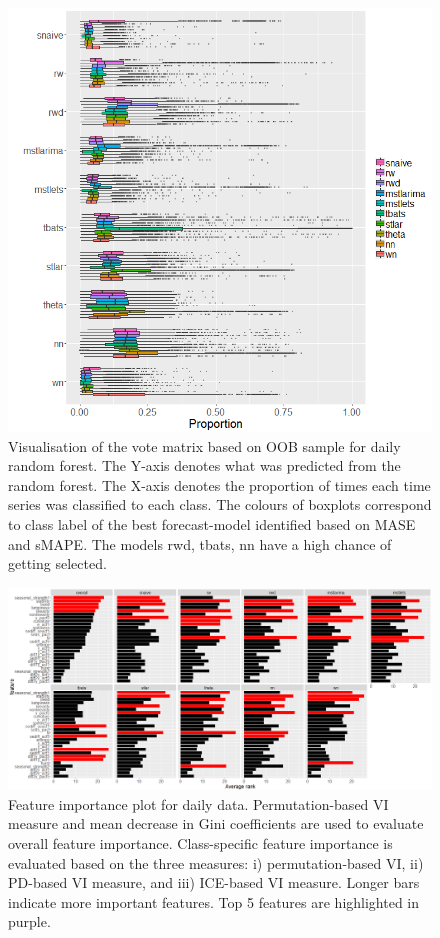 \documentclass[11pt,a4paper,]{article}
\begin{document}
\begin{figure}
\centering
\includegraphics{figures/oobdaily-1.png}
\caption{\label{fig:oobdaily}Visualisation of the vote matrix based on OOB sample for daily random forest. The Y-axis denotes what was predicted from the random forest. The X-axis denotes the proportion of times each time series was classified to each class. The colours of boxplots correspond to class label of the best forecast-model identified based on MASE and sMAPE. The models rwd, tbats, nn have a high chance of getting selected.}
\end{figure}

\clearpage

\begin{figure}[h]

{\centering \includegraphics{figures/vidaily-1} 

}

\caption{Feature importance plot for daily data. Permutation-based VI measure and mean decrease in Gini coefficients are used to evaluate overall feature importance. Class-specific feature importance is evaluated based on the three measures: i) permutation-based VI, ii) PD-based VI measure, and iii) ICE-based VI measure. Longer bars indicate more important features. Top 5 features are highlighted in purple.}\label{fig:vidaily}
\end{figure}
\end{document}
